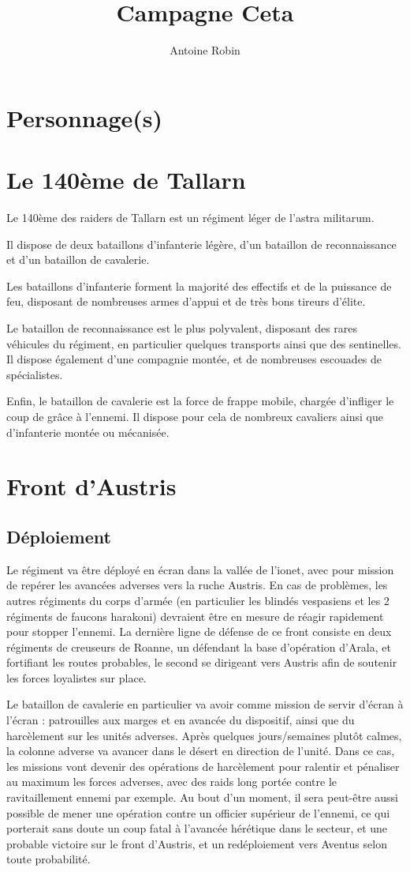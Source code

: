 \documentclass[10pt,a4paper]{book}
\author{ Antoine Robin}
\title{Campagne Ceta}
\begin{document}
\maketitle
\chapter{Personnage(s)}
\chapter{Le 140ème de Tallarn}
Le 140ème des raiders de Tallarn est un régiment léger de l'astra militarum. 

Il dispose de deux bataillons d'infanterie légère, d'un bataillon de reconnaissance et d'un bataillon de cavalerie.

Les bataillons d'infanterie forment la majorité des effectifs et de la puissance de feu, disposant de nombreuses armes d'appui et de très bons tireurs d'élite.

Le bataillon de reconnaissance est le plus polyvalent, disposant des rares véhicules du régiment, en particulier quelques transports ainsi que des sentinelles. Il dispose également d'une compagnie montée, et de nombreuses escouades de spécialistes.

Enfin, le bataillon de cavalerie est la force de frappe mobile, chargée d'infliger le coup de grâce à l'ennemi. Il dispose pour cela de nombreux cavaliers ainsi que d'infanterie montée ou mécanisée.
\chapter{Front d'Austris}
\section{Déploiement}
Le régiment va être déployé en écran dans la vallée de l'ionet, avec pour mission de repérer les avancées adverses vers la ruche Austris. En cas de problèmes, les autres régiments du corps d'armée (en particulier les blindés vespasiens et les 2 régiments de faucons harakoni) devraient être en mesure de réagir rapidement pour stopper l'ennemi. La dernière ligne de défense de ce front consiste en deux régiments de creuseurs de Roanne, un défendant la base d'opération d'Arala, et fortifiant les routes probables, le second se dirigeant vers Austris afin de soutenir les forces loyalistes sur place.


Le bataillon de cavalerie en particulier va avoir comme mission de servir d'écran à l'écran : patrouilles aux marges et en avancée du dispositif, ainsi que du harcèlement sur les unités adverses. 
Après quelques jours/semaines plutôt calmes, la colonne adverse va avancer dans le désert en direction de l'unité. Dans ce cas, les missions vont devenir des opérations de harcèlement pour ralentir et pénaliser au maximum les forces adverses, avec des raids long portée contre le ravitaillement ennemi par exemple. Au bout d'un moment, il sera peut-être aussi possible de mener une opération contre un officier supérieur de l'ennemi, ce qui porterait sans doute un coup fatal à l'avancée hérétique dans le secteur, et une probable victoire sur le front d'Austris, et un redéploiement vers Aventus selon toute probabilité.
\end{document}
